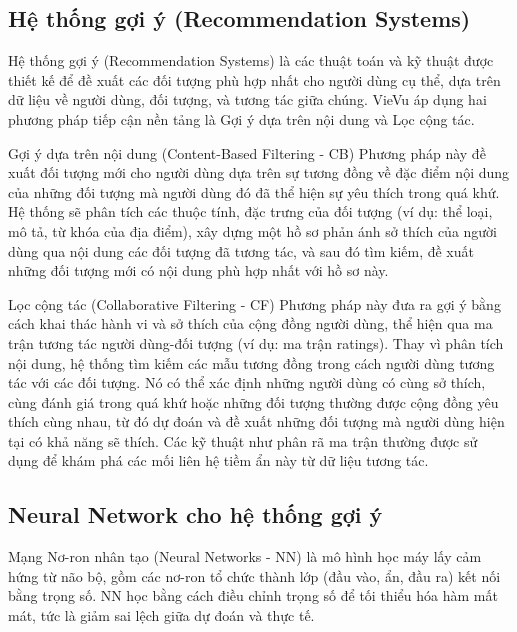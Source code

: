 \subsection{Hệ thống gợi ý (Recommendation Systems)}
Hệ thống gợi ý (Recommendation Systems) là các thuật toán và kỹ thuật được thiết kế để đề xuất các đối tượng phù hợp nhất cho người dùng cụ thể, dựa trên dữ liệu về người dùng, đối tượng, và tương tác giữa chúng. VieVu áp dụng hai phương pháp tiếp cận nền tảng là Gợi ý dựa trên nội dung và Lọc cộng tác.
 
Gợi ý dựa trên nội dung (Content-Based Filtering - CB)\cite{cb_concept}
 Phương pháp này đề xuất đối tượng mới cho người dùng dựa trên sự tương đồng về đặc điểm nội dung của những đối tượng mà người dùng đó đã thể hiện sự yêu thích trong quá khứ. Hệ thống sẽ phân tích các thuộc tính, đặc trưng của đối tượng (ví dụ: thể loại, mô tả, từ khóa của địa điểm), xây dựng một hồ sơ phản ánh sở thích của người dùng qua nội dung các đối tượng đã tương tác, và sau đó tìm kiếm, đề xuất những đối tượng mới có nội dung phù hợp nhất với hồ sơ này.
 
 
Lọc cộng tác (Collaborative Filtering - CF)\cite{cf_concept}
 Phương pháp này đưa ra gợi ý bằng cách khai thác hành vi và sở thích của cộng đồng người dùng, thể hiện qua ma trận tương tác người dùng-đối tượng (ví dụ: ma trận ratings). Thay vì phân tích nội dung, hệ thống tìm kiếm các mẫu tương đồng trong cách người dùng tương tác với các đối tượng. Nó có thể xác định những người dùng có cùng sở thích, cùng đánh giá trong quá khứ hoặc những đối tượng thường được cộng đồng yêu thích cùng nhau, từ đó dự đoán và đề xuất những đối tượng mà người dùng hiện tại có khả năng sẽ thích. Các kỹ thuật như phân rã ma trận thường được sử dụng để khám phá các mối liên hệ tiềm ẩn này từ dữ liệu tương tác.
\subsection{Neural Network cho hệ thống gợi ý}
Mạng Nơ-ron nhân tạo (Neural Networks - NN) là mô hình học máy lấy cảm hứng từ não bộ, gồm các nơ-ron tổ chức thành lớp (đầu vào, ẩn, đầu ra) kết nối bằng trọng số. NN học bằng cách điều chỉnh trọng số để tối thiểu hóa hàm mất mát, tức là giảm sai lệch giữa dự đoán và thực tế.

